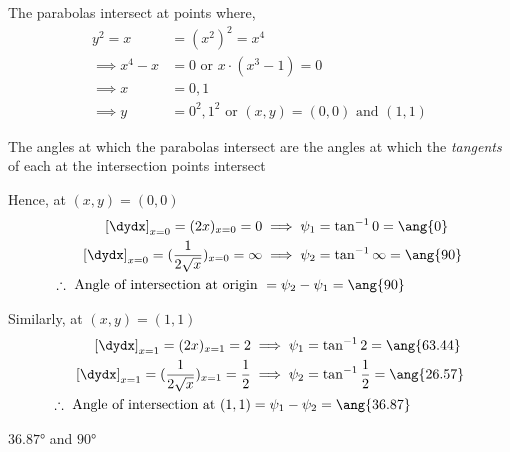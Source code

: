 \ifprintanswers
  \begin{marginfigure}
    \centerline{\box\figBoxA}
  \end{marginfigure}
\else
  \vspace{1cm}
  \centerline{\box\figBoxA}
\fi

\begin{solution}[\fullpage]
	The parabolas intersect at points where, 
	\begin{align}
		y^2 = x &= (x^2)^2 = x^4 \\
		\implies x^4-x &= 0 \text{ or } x\cdot(x^3-1) = 0 \\
		\implies x &= 0,1 \\
		\implies y &= 0^2, 1^2 \text{ or } (x,y) = (0,0) \text{ and } (1,1)
	\end{align}
	
	The angles at which the parabolas intersect are the angles at which 
	the \textit{tangents} of each at the intersection points intersect
	
	Hence, at $(x,y) = (0,0)$
	\begin{align}
		\left[\dydx\right]_{x=0} = (2x)_{x=0} = 0 &\implies \psi_1 = \tan^{-1}0 = \ang{0} \\
		\left[\dydx\right]_{x=0} = (\dfrac{1}{2\sqrt{x}})_{x=0} = \infty &\implies \psi_2 
		= \tan^{-1}\infty = \ang{90} \\
		\therefore\text{ Angle of intersection at origin } &= \psi_2-\psi_1 = \ang{90}
	\end{align}
	
	Similarly, at $(x,y) = (1,1)$
	\begin{align}
		\left[\dydx\right]_{x=1} = (2x)_{x=1} = 2 &\implies \psi_1 = \tan^{-1}2 = \ang{63.44} \\
		\left[\dydx\right]_{x=1} = (\dfrac{1}{2\sqrt{x}})_{x=1} = \frac{1}{2} &\implies \psi_2 
		= \tan^{-1}\frac{1}{2} = \ang{26.57} \\
		\therefore\text{ Angle of intersection at }(1,1) &= \psi_1-\psi_2 = \ang{36.87}
	\end{align}
\end{solution}
\ifprintanswers\begin{codex}$\ang{36.87}$ and $\ang{90}$\end{codex}\fi
